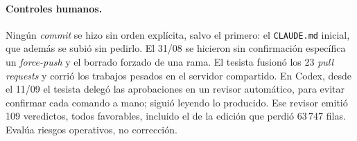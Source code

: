 \documentclass[11pt,a4paper]{article}
\newcommand{\code}[1]{\texttt{#1}}
\begin{document}
\paragraph{Controles humanos.} Ningún \emph{commit} se hizo sin orden explícita, salvo el primero: el
\code{CLAUDE.md} inicial, que además se subió sin pedirlo. El 31/08 se hicieron sin confirmación específica
un \emph{force-push} y el borrado forzado de una rama. El tesista fusionó los 23 \emph{pull requests} y corrió
los trabajos pesados en el servidor compartido. En Codex, desde el 11/09 el tesista delegó las aprobaciones en
un revisor automático, para evitar confirmar cada comando a mano; siguió leyendo lo producido. Ese revisor emitió 109 veredictos, todos favorables, incluido el de la edición que
perdió 63\,747 filas. Evalúa riesgos operativos, no corrección.

\end{document}
